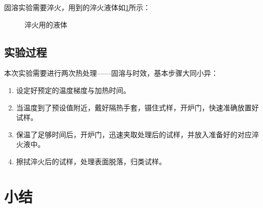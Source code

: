 固溶实验需要淬火，用到的淬火液体如\ref{fig:淬火用液体}所示：
\begin{figure}[h!]
	\centering
	\hspace{0.5in} %
	\caption{淬火用的液体}
	\label{fig:淬火用液体}
\end{figure}
\subsection{实验过程}
本次实验需要进行两次热处理——固溶与时效，基本步骤大同小异：
\begin{enumerate}
	\item 设定好预定的温度梯度与加热时间。
	\item 当温度到了预设值附近，戴好隔热手套，镊住式样，开炉门，快速准确放置好试样。
	\item 保温了足够时间后，开炉门，迅速夹取处理后的试样，并放入准备好的对应淬火液中。
	\item 擦拭淬火后的试样，处理表面脱落，归类试样。
\end{enumerate}

\section{小结}
